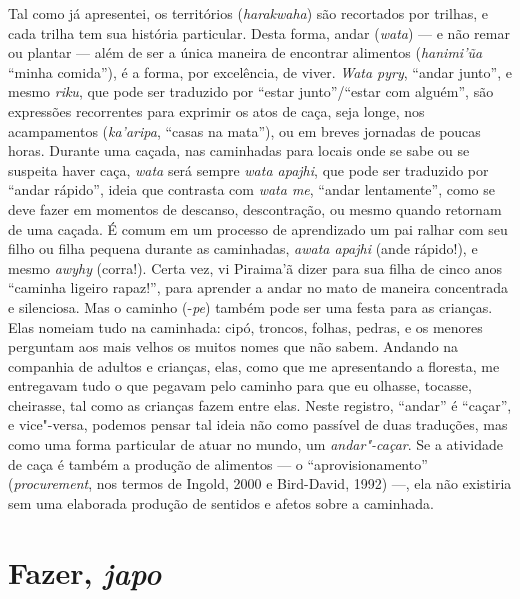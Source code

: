 Tal como já apresentei, os territórios (\emph{harakwaha}) são recortados
por trilhas, e cada trilha tem sua história particular. Desta forma,
andar (\emph{wata}) --- e não remar ou plantar --- além de ser a única
maneira de encontrar alimentos (\emph{hanimi'ũa} ``minha comida''), é a
forma, por excelência, de viver. \emph{Wata pyry}, ``andar junto'', e
mesmo \emph{riku}, que pode ser traduzido por ``estar junto''/``estar
com alguém'', são expressões recorrentes para exprimir os atos de caça,
seja longe, nos acampamentos (\emph{ka'aripa}, ``casas na mata''), ou em
breves jornadas de poucas horas. Durante uma caçada, nas caminhadas para
locais onde se sabe ou se suspeita haver caça, \emph{wata} será sempre
\emph{wata apajhi}, que pode ser traduzido por ``andar rápido'', ideia
que contrasta com \emph{wata me}, ``andar lentamente'', como se deve
fazer em momentos de descanso, descontração, ou mesmo quando retornam de
uma caçada. É comum em um processo de aprendizado um pai ralhar com seu
filho ou filha pequena durante as caminhadas, \emph{awata apajhi} (ande
rápido!), e mesmo \emph{awyhy} (corra!). Certa vez, vi Piraima'ã dizer
para sua filha de cinco anos ``caminha ligeiro rapaz!'', para aprender a
andar no mato de maneira concentrada e silenciosa. Mas o caminho
(-\emph{pe}) também pode ser uma festa para as crianças. Elas nomeiam
tudo na caminhada: cipó, troncos, folhas, pedras, e os menores perguntam
aos mais velhos os muitos nomes que não sabem. Andando na companhia de
adultos e crianças, elas, como que me apresentando a floresta, me
entregavam tudo o que pegavam pelo caminho para que eu olhasse, tocasse,
cheirasse, tal como as crianças fazem entre elas. Neste registro,
``andar'' é ``caçar'', e vice"-versa, podemos pensar tal ideia não como
passível de duas traduções, mas como uma forma particular de atuar no
mundo, um \emph{andar"-caçar}. Se a atividade de caça é também a produção
de alimentos --- o ``aprovisionamento'' (\emph{procurement}, nos termos de
Ingold, 2000 e Bird-David, 1992) ---, ela não existiria sem uma elaborada
produção de sentidos e afetos sobre a caminhada.

\section{Fazer, \emph{japo}}\label{fazer-japo}

